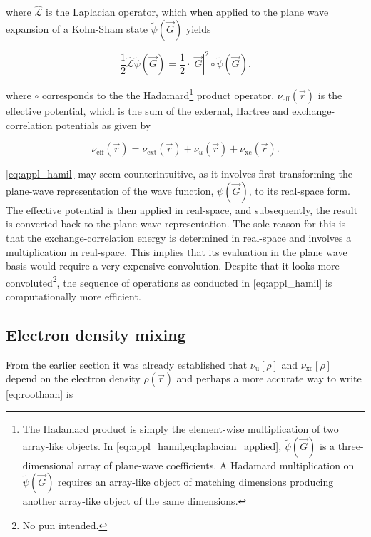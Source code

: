 where $\hat{\mathcal{L}}$ is the Laplacian operator, which when applied to the plane wave expansion of a Kohn-Sham state $\tilde{\psi}(\vec{G})$ yields

\begin{equation}
    \frac{1}{2} \hat{\mathcal{L}}\tilde{\psi}(\vec{G}) = \frac{1}{2} \cdot |\vec{G}|^{2} \circ \tilde{\psi}(\vec{G}).
    \label{eq:laplacian_applied}
\end{equation}

where $\circ$ corresponds to the the Hadamard\footnote{The Hadamard product is simply the element-wise multiplication of two array-like objects. In \cref{eq:appl_hamil,eq:laplacian_applied}, $\tilde{\psi}(\vec{G})$ is a three-dimensional array of plane-wave coefficients. A Hadamard multiplication on $\tilde{\psi}(\vec{G})$ requires an array-like object of matching dimensions producing another array-like object of the same dimensions.} product operator. $\nu_{\text{eff}}(\vec{r})$ is the effective potential, which is the sum of the external, Hartree and exchange-correlation potentials as given by

\begin{equation}
    \nu_{\text{eff}}(\vec{r}) = \nu_{\text{ext}}(\vec{r}) + \nu_{u}(\vec{r}) + \nu_{\text{xc}}(\vec{r}).
\end{equation}

\cref{eq:appl_hamil} may seem counterintuitive, as it involves first transforming the plane-wave representation of the wave function, $\psi(\vec{G})$, to its real-space form. The effective potential is then applied in real-space, and subsequently, the result is converted back to the plane-wave representation. The sole reason for this is that the exchange-correlation energy is determined in real-space and involves a multiplication in real-space. This implies that its evaluation in the plane wave basis would require a very expensive convolution. Despite that it looks more convoluted\footnote{No pun intended.}, the sequence of operations as conducted in \cref{eq:appl_hamil} is computationally more efficient.

%
%
%
\subsection{Electron density mixing}

From the earlier section it was already established that $\nu_{\text{u}}[\rho]$ and $\nu_{\text{xc}}[\rho]$ depend on the electron density $\rho(\vec{r})$ and perhaps a more accurate way to write \cref{eq:roothaan} is

